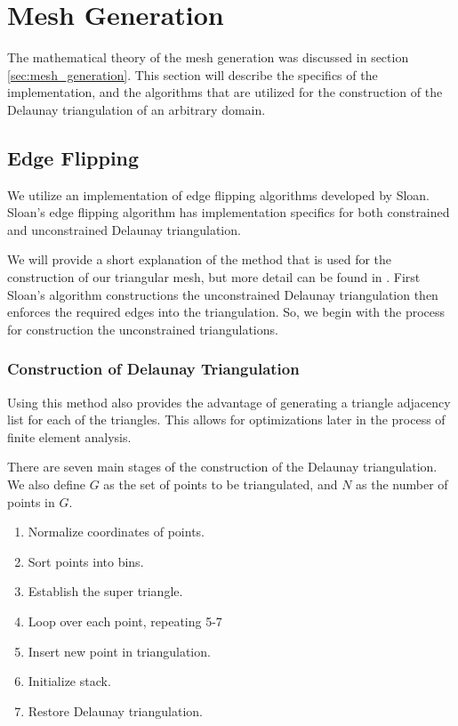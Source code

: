 \documentclass[../fem.tex]{subfile}
\begin{document}
\section{Mesh Generation}%
\label{sec:mesh_generation2}

The mathematical theory of the mesh generation was discussed in section
\ref{sec:mesh_generation}. This section will describe the specifics of the
implementation, and the algorithms that are utilized for the construction of
the Delaunay triangulation of an arbitrary domain.

\subsection{Edge Flipping}%
\label{sub:edge_flipping}

We utilize an implementation of edge flipping algorithms developed by Sloan.
Sloan's edge flipping algorithm has implementation specifics for both
constrained and unconstrained Delaunay triangulation.

We will provide a short explanation of the method that is used for the
construction of our triangular mesh, but more detail can be found in
\cite{S_DT}\cite{S_CDT}. First Sloan's algorithm constructions the
unconstrained Delaunay triangulation then enforces the required edges into the
triangulation. So, we begin with the process for construction the unconstrained
triangulations.

\subsubsection{Construction of Delaunay Triangulation}%
\label{ssub:construction_of_delaunay_triangulation}

Using this method also provides the advantage of generating a triangle
adjacency list for each of the triangles. This allows for optimizations later
in the process of finite element analysis.

There are seven main stages of the construction of the Delaunay triangulation.
We also define $G$ as the set of points to be triangulated, and $N$ as the
number of points in $G$.

\begin{enumerate}[label=\arabic*.]
  \item Normalize coordinates of points.
  \item Sort points into bins.
  \item Establish the super triangle.
  \item Loop over each point, repeating 5-7
  \item Insert new point in triangulation.
  \item Initialize stack.
  \item Restore Delaunay triangulation.
\end{enumerate}
\end{document}
